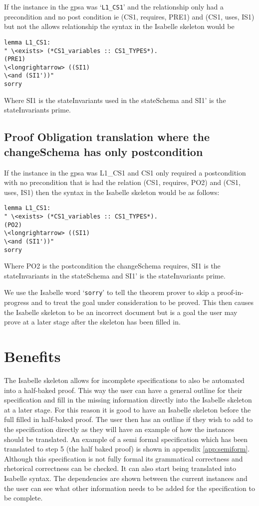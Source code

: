 If the instance in the \gls{gpsa} was `\texttt{L1\_CS1}' and the relationship
only had a precondition and no post condition ie (CS1, requires, PRE1) and (CS1,
uses, IS1) but not the allows relationship the syntax in the Isabelle skeleton
would be 

\begin{verbatim}
lemma L1_CS1:
" \<exists> (*CS1_variables :: CS1_TYPES*).
(PRE1)
\<longrightarrow> ((SI1)
\<and (SI1'))"
sorry
\end{verbatim}

Where SI1 is the stateInvariants used in the stateSchema and SI1' is the
stateInvariants prime.

\subsection{Proof Obligation translation where the changeSchema has only postcondition}

If the instance in the \gls{gpsa} was L1\_CS1 and CS1 only required a
postcondition with no precondition that is had the relation (CS1, requires, PO2)
and (CS1, uses, IS1) then the syntax in the Isabelle skeleton would be as
follows:

\begin{verbatim}
lemma L1_CS1:
" \<exists> (*CS1_variables :: CS1_TYPES*).
(PO2)
\<longrightarrow> ((SI1)
\<and (SI1'))"
sorry
\end{verbatim}

Where PO2 is the postcondition the changeSchema requires, SI1 is the
stateInvariants in the stateSchema and SI1' is the stateInvariants prime. 

We use the Isabelle word `\texttt{sorry}' to tell the theorem prover to skip a
proof-in-progress and to treat the goal under consideration to be proved. This
then causes the Isabelle skeleton to be an incorrect document but is a goal the
user may prove at a later stage after the skeleton has been filled in.

\section{Benefits}

The Isabelle skeleton allows for incomplete specifications to also be automated
into a half-baked proof. This way the user can have a general outline for their
specification and fill in the missing information directly into the Isabelle
skeleton at a later stage. For this reason it is good to have an Isabelle
skeleton before the full filled in half-baked proof. The user then has an
outline if they wish to add to the specification directly as they will have an
example of how the instances should be translated. An example of a semi formal
specification which has been translated to step 5 (the half baked proof) is
shown in appendix \ref{app:semiform}. Although this specification is not fully
formal its grammatical correctness and rhetorical correctness can be checked. It
can also start being translated into Isabelle syntax. The dependencies are shown
between the current instances and the user can see what other information needs
to be added for the specification to be complete.

